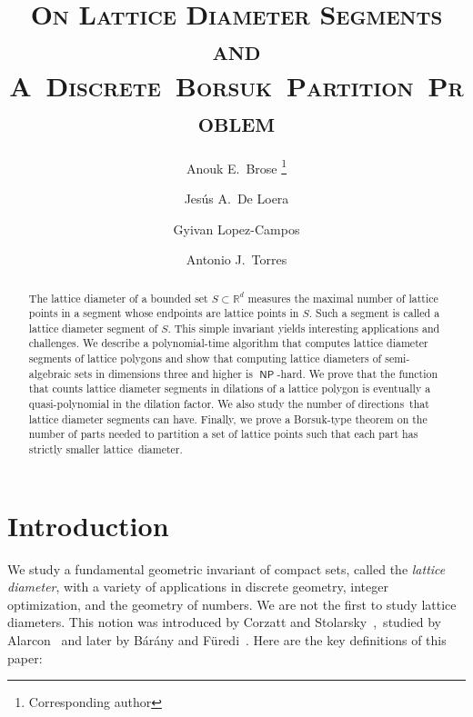 \documentclass[11pt]{article}
\title{\scshape On Lattice Diameter Segments and \mbox{A Discrete Borsuk Partition Problem}}
\date{}
\author[1]{Anouk E.~Brose \thanks{Corresponding author}}
\author[1]{Jes\'us A.~De Loera}
\author[1]{Gyivan Lopez-Campos}
\author[1]{Antonio J.~Torres}
\affil[1]{\small \scshape Department of Mathematics, University of California, Davis}
\newcommand{\R}{\mathbb{R}}
\DeclareMathOperator{\NP}{\mathsf{NP}} %
\begin{document}
\maketitle




\begin{abstract}
    \noindent The lattice diameter of a bounded set $S \subset \R^d$ measures the maximal number of lattice points in a segment whose endpoints are lattice points in $S$. Such a segment is called a lattice diameter segment of $S$. This simple invariant yields interesting applications and challenges. We describe a polynomial-time algorithm that computes lattice diameter segments of lattice polygons and show that computing lattice diameters of semi-algebraic sets in dimensions three and higher is $\NP$-hard.
    We prove that the function that counts lattice diameter segments in dilations of a lattice polygon is eventually a quasi-polynomial in the dilation factor.
    We also study the number of \mbox{directions that} lattice diameter segments can have. Finally, we prove a Borsuk-type theorem on the number of parts needed to partition a set of lattice points such that each part has strictly smaller \mbox{lattice diameter}.
\end{abstract}

\section{Introduction}  

We study a fundamental geometric invariant of compact sets, called the \textit{lattice diameter}, with a variety of applications in discrete geometry, integer optimization, and the geometry of numbers. We are not the first to study lattice diameters.
This notion was introduced by Corzatt and \mbox{Stolarsky~\cite{Corzatt_PhD}, 
studied} by Alarcon~\cite{Alarcon_PhD} and later by Bárány and Füredi~\cite{Barany_Furedi}. Here are the key definitions of this paper: 
\end{document}
